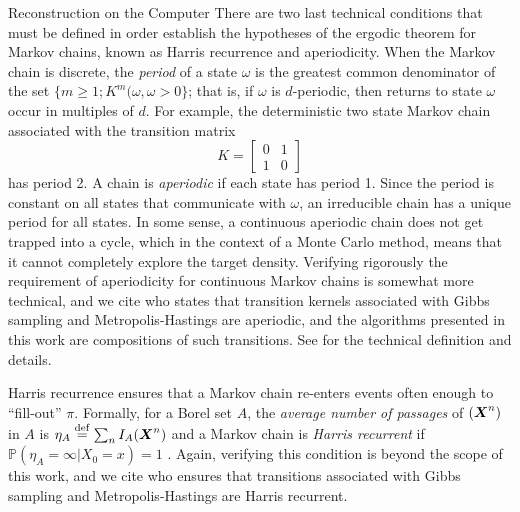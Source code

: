 \begin{chapter}{Reconstruction on the Computer}
There are two last technical conditions that must be defined in order establish the hypotheses of the ergodic theorem for Markov chains, known as Harris recurrence and aperiodicity.
When the Markov chain is discrete, the \emph{period} of a state $\omega$ is the greatest common denominator of the set $\{m\ge 1; K^m(\omega,\omega > 0\}$; that is, if $\omega$ is $d$-periodic, then returns to state $\omega$ occur in multiples of $d$.
For example, the deterministic two state Markov chain associated with the transition matrix
\begin{equation}
  K = \begin{bmatrix}
    0 & 1\\
    1 & 0
  \end{bmatrix}
\end{equation}
has period 2.
A chain is \emph{aperiodic} if each state has period 1. 
Since the period is constant on all states that communicate with $\omega$, an irreducible chain has a unique period for all states.  
In some sense, a continuous aperiodic chain does not get trapped into a cycle, which in the context of a Monte Carlo method, means that it cannot completely explore the target density.
Verifying rigorously the requirement of aperiodicity for continuous Markov chains is somewhat more technical, and we cite \citep{liu2008monte} who states that transition kernels associated with Gibbs sampling and Metropolis-Hastings are aperiodic, and the algorithms presented in this work are compositions of such transitions.
See \citep{robert2013monte} for the technical definition and details.

Harris recurrence ensures that a Markov chain re-enters events often enough to ``fill-out'' $\pi$. 
Formally, for a Borel set $A$, the \emph{average number of passages} of $(\mbox{\boldmath$X$}^n)$ in $A$ is $\eta_A\stackrel{\rm def}{=} \sum_n I_A(\mbox{\boldmath$X$}^n)$ and a Markov chain is \emph{Harris recurrent} if $\mathbb P(\eta_A = \infty|X_0=x) =1$ \citep{robert2013monte}. 
Again, verifying this condition is beyond the scope of this work, and we cite \citep{robert2013monte} who ensures that transitions associated with Gibbs sampling and Metropolis-Hastings are Harris recurrent.


\end{chapter}
